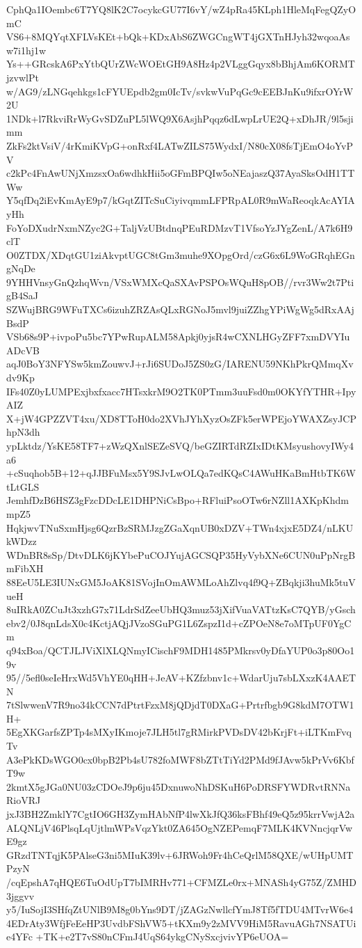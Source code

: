CphQa1IOembc6T7YQ8lK2C7ocykcGU77I6vY/wZ4pRa45KLph1HleMqFegQZyOmC
VS6+8MQYqtXFLVsKEt+bQk+KDxAbS6ZWGCngWT4jGXTnHJyh32wqoaAsw7i1hj1w
Ys++GRcskA6PxYtbQUrZWcWOEtGH9A8Hz4p2VLggGqyx8bBhjAm6KORMTjzvwlPt
w/AG9/zLNGqehkgs1cFYUEpdb2gm0IcTv/svkwVuPqGc9cEEBJnKu9ifxrOYrW2U
1NDk+l7RkviRrWyGvSDZuPL5lWQ9X6AsjhPqqz6dLwpLrUE2Q+xDhJR/9l5sjimm
ZkFs2ktVsiV/4rKmiKVpG+onRxf4LATwZILS75WydxI/N80cX08fsTjEmO4oYvPV
c2kPc4FnAwUNjXmzsxOa6wdhkHii5oGFmBPQIw5oNEajaszQ37AyaSksOdH1TTWw
Y5qfDq2iEvKmAyE9p7/kGqtZITcSuCiyivqmmLFPRpAL0R9mWaReoqkAcAYIAyHh
FoYoDXudrNxmNZyc2G+TaljVzUBtdnqPEuRDMzvT1VfsoYzJYgZenL/A7k6H9clT
O0ZTDX/XDqtGU1ziAkvptUGC8tGm3muhe9XOpgOrd/czG6x6L9WoGRqhEGngNqDe
9YHHVnsyGnQzhqWvn/VSxWMXcQaSXAvPSPOsWQuH8pOB//rvr3Ww2t7PtigB4SaJ
SZWujBRG9WFuTXCs6izuhZRZAsQLxRGNoJ5mvl9juiZZhgYPiWgWg5dRxAAjBsdP
VSb68s9P+ivpoPu5bc7YPwRupALM58Apkj0yjsR4wCXNLHGyZFF7xmDVYIuADcVB
aqJ0BoY3NFYSw5kmZouwvJ+rJi6SUDoJ5ZS0zG/IARENU59NKhPkrQMmqXvdv9Kp
IFs40Z0yLUMPExjbxfxacc7HTsxkrM9O2TK0PTmm3uuFsd0m0OKYfYTHR+IpyAIZ
X+jW4GPZZVT4xu/XD8TToH0do2XVhJYhXyzOsZFk5erWPEjoYWAXZsyJCPhpN3dh
ypLktdz/YsKE58TF7+zWzQXnlSEZeSVQ/beGZIRTdRZIxIDtKMsyushovyIWy4a6
+cSuqhob5B+12+qJJBFuMsx5Y9SJvLwOLQa7edKQsC4AWuHKaBmHtbTK6WtLtGLS
JemhfDzB6HSZ3gFzcDDcLE1DHPNiCsBpo+RFluiPsoOTw6rNZll1AXKpKhdmmpZ5
HqkjwvTNuSxmHjsg6QzrBzSRMJzgZGaXqnUB0xDZV+TWn4xjxE5DZ4/nLKUkWDzz
WDnBR8sSp/DtvDLK6jKYbePuCOJYujAGCSQP35HyVybXNe6CUN0uPpNrgBmFibXH
88EeU5LE3IUNxGM5JoAK81SVojInOmAWMLoAhZlvq4f9Q+ZBqkji3huMk5tuVueH
8uIRkA0ZCuJt3xzhG7x71LdrSdZeeUbHQ3muz53jXifVuaVATtzKsC7QYB/yGsch
ebv2/0J8qnLdsX0c4KctjAQjJVzoSGuPG1L6ZspzI1d+cZPOeN8e7oMTpUF0YgCm
q94xBoa/QCTJLJViXlXLQNmyICischF9MDH1485PMkrsv0yDfaYUP0o3p80Oo19v
95//5efl0seIeHrxWd5VhYE0qHH+JeAV+KZfzbnv1c+WdarUju7sbLXxzK4AAETN
7tSlwwenV7R9no34kCCN7dPtrtFzxM8jQDjdT0DXaG+Prtrfbgb9G8kdM7OTW1H+
5EgXKGarfsZPTp4sMXyIKmoje7JLH5tl7gRMirkPVDsDV42bKrjFt+iLTKmFvqTv
A3ePkKDsWGO0cx0bpB2Pb4sU782foMWF8bZTtTiYd2PMd9fJAvw5kPrVv6KbfT9w
2kmtX5gJGa0NU03zCDOeJ9p6ju45DxnuwoNhDSKuH6PoDRSFYWDRvtRNNaRioVRJ
jxJ3BH2ZmklY7CgtIO6GH3ZymHAbNfP4lwXkJfQ36ksFBhf49eQ5z95krrVwjA2a
ALQNLjV46PlsqLqUjtlmWPsVqzYkt0ZA645OgNZEPemqF7MLK4KVNncjqrVwE9gz
GRzdTNTqjK5PAlseG3ni5MIuK39lv+6JRWoh9Fr4hCeQrlM58QXE/wUHpUMTPzyN
/cqEpshA7qHQE6TuOdUpT7bIMRHv771+CFMZLe0rx+MNASh4yG75Z/ZMHD3jggvv
y5/IuSojI3SHfqZtUNlB9M8g0bYns9DT/jZAGzNwllcfYmJ8Tf5fTDU4MTvrW6e4
4EDrAty3WfjFeEeHP3UvdbFShVW5+tKXm9y2zMVV9HiM5RavuAGh7NSATUie4YFc
+TK+e2T7vS80nCFmJ4UqS64ykgCNySxcjvivYP6eUOA=

